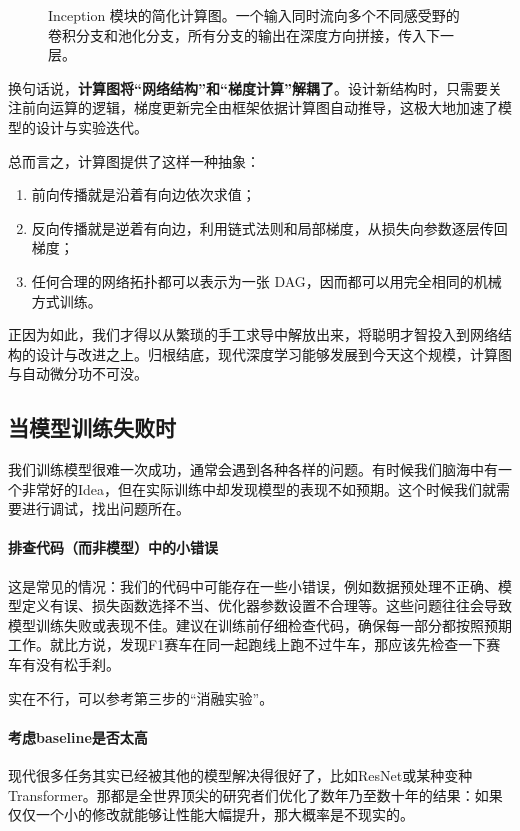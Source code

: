 \begin{figure}
    \centering
    
    \caption{Inception 模块的简化计算图。一个输入同时流向多个不同感受野的卷积分支和池化分支，所有分支的输出在深度方向拼接，传入下一层。}
    \label{fig:inception_computation_graph}
\end{figure}

换句话说，\textbf{计算图将“网络结构”和“梯度计算”解耦了}。设计新结构时，只需要关注前向运算的逻辑，梯度更新完全由框架依据计算图自动推导，这极大地加速了模型的设计与实验迭代。

总而言之，计算图提供了这样一种抽象：
\begin{enumerate}
    \item 前向传播就是沿着有向边依次求值；
    \item 反向传播就是逆着有向边，利用链式法则和局部梯度，从损失向参数逐层传回梯度；
    \item 任何合理的网络拓扑都可以表示为一张 DAG，因而都可以用完全相同的机械方式训练。
\end{enumerate}
正因为如此，我们才得以从繁琐的手工求导中解放出来，将聪明才智投入到网络结构的设计与改进之上。归根结底，现代深度学习能够发展到今天这个规模，计算图与自动微分功不可没。

\subsection{当模型训练失败时}

我们训练模型很难一次成功，通常会遇到各种各样的问题。有时候我们脑海中有一个非常好的Idea，但在实际训练中却发现模型的表现不如预期。这个时候我们就需要进行调试，找出问题所在。

\paragraph{排查代码（而非模型）中的小错误} 这是常见的情况：我们的代码中可能存在一些小错误，例如数据预处理不正确、模型定义有误、损失函数选择不当、优化器参数设置不合理等。这些问题往往会导致模型训练失败或表现不佳。建议在训练前仔细检查代码，确保每一部分都按照预期工作。就比方说，发现F1赛车在同一起跑线上跑不过牛车，那应该先检查一下赛车有没有松手刹。

实在不行，可以参考第三步的“消融实验”。

\paragraph{考虑baseline是否太高} 现代很多任务其实已经被其他的模型解决得很好了，比如ResNet或某种变种Transformer。那都是全世界顶尖的研究者们优化了数年乃至数十年的结果：如果仅仅一个小的修改就能够让性能大幅提升，那大概率是不现实的。


